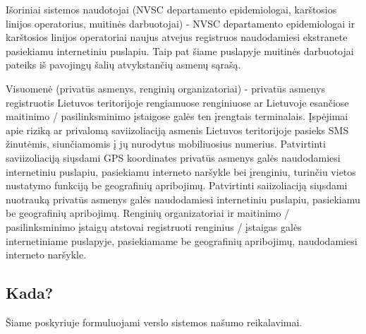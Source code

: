 \documentclass{VUMIFPSkursinis}
\begin{document}
Išoriniai sistemos naudotojai (NVSC departamento epidemiologai, karštosios linijos operatorius, muitinės darbuotojai) - NVSC departamento epidemiologai ir karštosios linijos operatoriai naujus atvejus registruos naudodamiesi
ekstranete pasiekiamu internetiniu puslapiu. Taip pat šiame puslapyje muitinės darbuotojai pateiks iš pavojingų šalių atvykstančių asmenų sąrašą.

Visuomenė (privatūs asmenys, renginių organizatoriai) - privatūs asmenys registruotis Lietuvos teritorijoje rengiamuose renginiuose ar Lietuvoje esančiose maitinimo / pasilinksminimo
įstaigose galės ten įrengtais terminalais. Įspėjimai apie riziką ar privalomą saviizoliaciją asmenis Lietuvos teritorijoje pasieks SMS žinutėmis, siunčiamomis į jų nurodytus
mobiliuosius numerius. Patvirtinti saviizoliaciją siųsdami GPS koordinates privatūs asmenys galės naudodamiesi internetiniu puslapiu, pasiekiamu interneto naršykle bei įrenginiu,
turinčiu vietos nustatymo funkciją be geografinių apribojimų. Patvirtinti saiizoliaciją siųsdami nuotrauką privatūs asmenys galės naudodamiesi internetiniu puslapiu, pasiekiamu
be geografinių apribojimų. Renginių organizatoriai ir maitinimo / pasilinksminimo įstaigų atstovai registruoti renginius / įstaigas galės internetiniame puslapyje, pasiekiamame
be geografinių apribojimų, naudodamiesi interneto naršykle.

\subsection{Kada?}
Šiame poskyriuje formuluojami verslo sistemos našumo reikalavimai.
\end{document}
